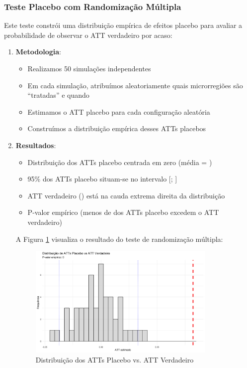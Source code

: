 \documentclass[
	12pt,				%
	oneside,			%
	a4paper,			%
	english,			%
	french,				%
	spanish,			%
	brazil				%
	]{abntex2}
\begin{document}
\subsubsection{Teste Placebo com Randomização Múltipla}

Este teste constrói uma distribuição empírica de efeitos placebo para avaliar a probabilidade de observar o ATT verdadeiro por acaso:

\begin{enumerate}
\item \textbf{Metodologia}: 
\begin{itemize}
\item Realizamos 50 simulações independentes
\item Em cada simulação, atribuímos aleatoriamente quais microrregiões são ``tratadas'' e quando
\item Estimamos o ATT placebo para cada configuração aleatória
\item Construímos a distribuição empírica desses ATTs placebos
\end{itemize}

\item \textbf{Resultados}:
\begin{itemize}
\item Distribuição dos ATTs placebo centrada em zero (média = \placebomean)
\item 95\% dos ATTs placebo situam-se no intervalo [\placebolower; \placeboupper]
\item ATT verdadeiro (\placebotruatt) está na cauda extrema direita da distribuição
\item P-valor empírico \placebopvalue{} (menos de \placebopvaluepct{} dos ATTs placebo excedem o ATT verdadeiro)
\end{itemize}

A Figura \ref{fig:placebo} visualiza o resultado do teste de randomização múltipla:

\begin{figure}[!htbp]
\centering
\caption{Distribuição dos ATTs Placebo vs. ATT Verdadeiro}
\label{fig:placebo}
\includegraphics[width=0.85\textwidth]{../../../data/outputs/placebo_distribution.png}


\end{figure}
\end{enumerate}
\end{document}
